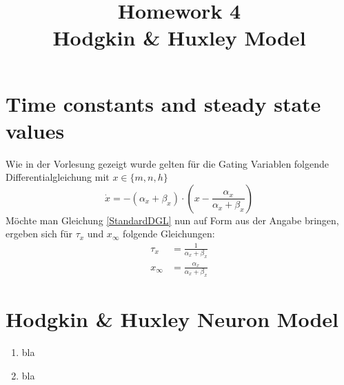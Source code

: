 \documentclass[conference]{IEEEtran}
\begin{document}
%
%
\title{Homework 4\\ Hodgkin \& Huxley Model}

\author{
}


\maketitle

\IEEEpeerreviewmaketitle

\section{Time constants and steady state values}
Wie in der Vorlesung gezeigt wurde gelten für die Gating Variablen folgende Differentialgleichung mit $x \in \{m,n,h\}$
\begin{equation}
	\dot{x} = -(\alpha_x + \beta_x) \cdot \left(x - \frac{\alpha_x}{\alpha_x + \beta_x}\right)
	\label{StandardDGL}
\end{equation}
Möchte man Gleichung \eqref{StandardDGL} nun auf Form aus der Angabe bringen, ergeben sich für $\tau_x$ und $x_{\infty}$ folgende Gleichungen:
\begin{align}
	\tau_x & = \frac{1}{\alpha_x + \beta_x}\\
	x_{\infty} & = \frac{\alpha_x}{\alpha_x + \beta_x}
\end{align}



\section{Hodgkin \& Huxley Neuron Model}
\begin{enumerate}
\item bla
\item bla
\end{enumerate}
\end{document}
